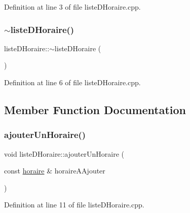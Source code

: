 Definition at line 3 of file liste\+D\+Horaire.\+cpp.

\hypertarget{classliste_d_horaire_a497a28a7b80534317d7ec387d4c8714b}{}\label{classliste_d_horaire_a497a28a7b80534317d7ec387d4c8714b} 
\subsubsection{\texorpdfstring{$\sim$liste\+D\+Horaire()}{~listeDHoraire()}}
{\footnotesize\ttfamily liste\+D\+Horaire\+::$\sim$liste\+D\+Horaire (\begin{DoxyParamCaption}{ }\end{DoxyParamCaption})}



Definition at line 6 of file liste\+D\+Horaire.\+cpp.



\subsection{Member Function Documentation}
\hypertarget{classliste_d_horaire_a30f35985eb14300ad9cf8f44ef9d651e}{}\label{classliste_d_horaire_a30f35985eb14300ad9cf8f44ef9d651e} 
\subsubsection{\texorpdfstring{ajouter\+Un\+Horaire()}{ajouterUnHoraire()}}
{\footnotesize\ttfamily void liste\+D\+Horaire\+::ajouter\+Un\+Horaire (\begin{DoxyParamCaption}\item[{const \hyperlink{classhoraire}{horaire} \&}]{horaire\+A\+Ajouter }\end{DoxyParamCaption})}



Definition at line 11 of file liste\+D\+Horaire.\+cpp.

\hypertarget{classliste_d_horaire_a23b08c00c1d32405bd84045ca9b6208a}{}\label{classliste_d_horaire_a23b08c00c1d32405bd84045ca9b6208a} 
